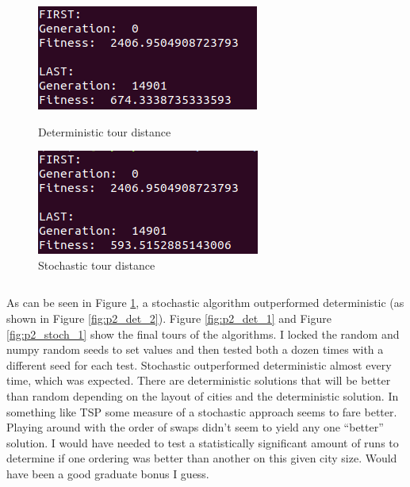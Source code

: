 \documentclass[12pt]{article}
\begin{document}
\begin{figure}[H]
\centering
\begin{minipage}{.45\textwidth}
  \centering
  \includegraphics[width=.75\linewidth]{images/p2_det_2}
  \caption{Deterministic tour distance}
  \label{fig:p2_det_2}
\end{minipage}\hfill
\begin{minipage}{.45\textwidth}
  \centering
  \includegraphics[width=.75\linewidth]{images/p2_stoch_2}
  \caption{Stochastic tour distance}
  \label{fig:p2_stoch_2}
\end{minipage}
\end{figure}

$$$$

As can be seen in Figure \ref{fig:p2_stoch_2}, a stochastic algorithm 
outperformed deterministic (as shown in Figure \ref{fig:p2_det_2}). Figure 
\ref{fig:p2_det_1} and Figure \ref{fig:p2_stoch_1} show the final tours of the 
algorithms. I locked the random and numpy random seeds to set values and then 
tested both a dozen times with a different seed for each test. Stochastic 
outperformed deterministic almost every time, which was expected. There are 
deterministic solutions that will be better than random depending on the layout 
of cities and the deterministic solution. In something like TSP some measure of 
a stochastic approach seems to fare better. Playing around with the order of 
swaps didn't seem to yield any one ``better'' solution. I would have needed to 
test a statistically significant amount of runs to determine if one ordering was 
better than another on this given city size. Would have been a good graduate 
bonus I guess. 
\end{document}
